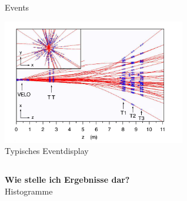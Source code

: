 \begin{frame}{Events}
\begin{center}
     \includegraphics[width=8cm]{Figures Lecture on Datanalysis/2D-Eventdisplay.png} \\
    Typisches Eventdisplay
\end{center}
   \end{frame}
   \subsection{}
   \begin{frame}

        \Large \textbf {Wie stelle ich Ergebnisse dar?} \\ 
        \quad Histogramme 

\end{frame}

  
\subsection{}

